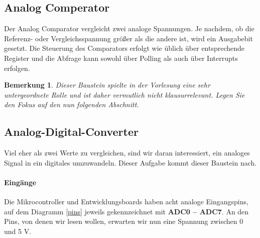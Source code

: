 \documentclass[11pt,a4paper]{scrartcl}
\newtheorem{note}{Bemerkung}
\begin{document}
\subsection{Analog Comperator}
Der Analog Comparator vergleicht zwei analoge Spannungen. Je nachdem, ob die Referenz- oder Vergleichsspannung größer als die andere ist, wird ein Ausgabebit gesetzt. Die Steuerung des Comparators erfolgt wie üblich über entsprechende Register und die Abfrage kann sowohl über Polling als auch über Interrupts erfolgen. \\
\begin{note}
Dieser Baustein spielte in der Vorlesung eine sehr untergeordnete Rolle und ist daher vermutlich nicht klausurrelevant. Legen Sie den Fokus auf den nun folgenden Abschnitt.
\end{note}
\subsection{Analog-Digital-Converter}
Viel eher als zwei Werte zu vergleichen, sind wir daran interessiert, ein analoges Signal in ein digitales umzuwandeln. Dieser Aufgabe kommt dieser Baustein nach. 
\paragraph{Eingänge} Die Mikrocontroller und Entwicklungsboards haben acht analoge Eingangspins, auf dem Diagramm \ref{pins} jeweils gekennzeichnet mit \textbf{ADC0 -- ADC7}. An den Pins, von denen wir lesen wollen, erwarten wir nun eine Spannung zwischen 0 und 5 V.
\end{document}
